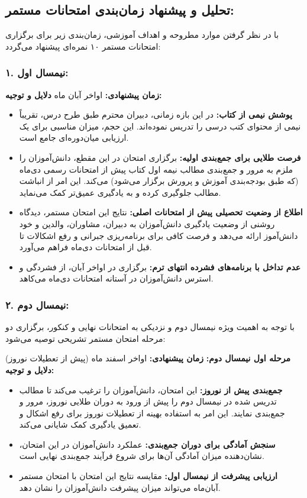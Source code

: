 \documentclass[a4paper]{article}
\begin{document}
\subsection*{تحلیل و پیشنهاد زمان‌بندی امتحانات مستمر:}
\medskip
با در نظر گرفتن موارد مطروحه و اهداف آموزشی، زمان‌بندی زیر برای برگزاری امتحانات مستمر ۱۰ نمره‌ای پیشنهاد می‌گردد:
\medskip

\subsubsection*{۱. نیمسال اول:}
\textbf{زمان پیشنهادی:} اواخر آبان ماه
\newline\textbf{دلایل و توجیه:}
\begin{itemize}
    \item \textbf{پوشش نیمی از کتاب:}  در این بازه زمانی، دبیران محترم طبق طرح درس، تقریباً نیمی از محتوای کتب درسی را تدریس نموده‌اند. این حجم، میزان مناسبی برای یک ارزیابی میان‌دوره‌ای جامع است.
    \item \textbf{فرصت طلایی برای جمع‌بندی اولیه:} برگزاری امتحان در این مقطع، دانش‌آموزان را ملزم به مرور و جمع‌بندی مطالب نیمه اول کتاب پیش از امتحانات رسمی دی‌ماه (که طبق بودجه‌بندی آموزش و پرورش برگزار می‌شود) می‌کند. این امر از انباشت مطالب جلوگیری کرده و به یادگیری عمیق‌تر کمک می‌نماید.
    \item \textbf{اطلاع از وضعیت تحصیلی پیش از امتحانات اصلی:} نتایج این امتحان مستمر، دیدگاه روشنی از وضعیت یادگیری دانش‌آموزان به دبیران، مشاوران، والدین و خود دانش‌آموز ارائه می‌دهد و فرصت کافی برای برنامه‌ریزی جبرانی و رفع اشکالات تا قبل از امتحانات دی‌ماه فراهم می‌آورد.
    \item \textbf{عدم تداخل با برنامه‌های فشرده انتهای ترم:} برگزاری در اواخر آبان، از فشردگی و استرس دانش‌آموزان در آستانه امتحانات دی‌ماه می‌کاهد.
\end{itemize}
\medskip

\subsubsection*{۲. نیمسال دوم:}
با توجه به اهمیت ویژه نیمسال دوم و نزدیکی به امتحانات نهایی و کنکور، برگزاری دو مرحله امتحان مستمر تشریحی توصیه می‌شود:
\medskip

\textbf{مرحله اول نیمسال دوم:}
\newline\textbf{زمان پیشنهادی:} اواخر اسفند ماه (پیش از تعطیلات نوروز)
\newline\textbf{دلایل و توجیه:}
\begin{itemize}
    \item \textbf{جمع‌بندی پیش از نوروز:} این امتحان، دانش‌آموزان را ترغیب می‌کند تا مطالب تدریس شده در نیمسال دوم را پیش از ورود به دوران طلایی نوروز، مرور و جمع‌بندی نمایند. این امر به استفاده بهینه از تعطیلات نوروز برای رفع اشکال و تعمیق یادگیری کمک شایانی می‌کند.
    \item \textbf{سنجش آمادگی برای دوران جمع‌بندی:} عملکرد دانش‌آموزان در این امتحان، نشان‌دهنده میزان آمادگی آن‌ها برای شروع فرآیند جمع‌بندی نهایی است.
    \item \textbf{ارزیابی پیشرفت از نیمسال اول:} مقایسه نتایج این امتحان با امتحان مستمر آبان‌ماه می‌تواند میزان پیشرفت دانش‌آموزان را نشان دهد.
\end{itemize}
\medskip
\end{document}
